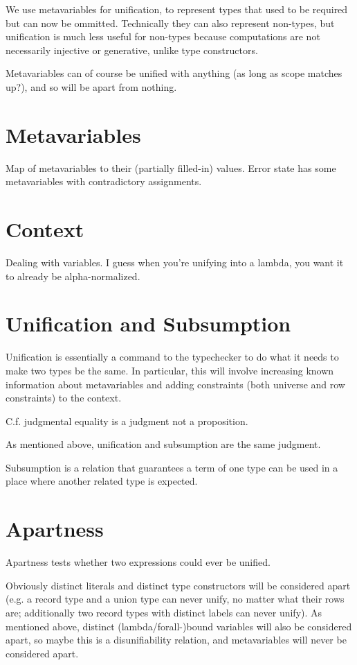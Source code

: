 \documentclass[11pt, twoside, reqno]{book}
\begin{document}
We use metavariables for unification, to represent types that used to be required but can now be ommitted.
Technically they can also represent non-types, but unification is much less useful for non-types because computations are not necessarily injective or generative, unlike type constructors.

Metavariables can of course be unified with anything (as long as scope matches up?), and so will be apart from nothing.

\section{Metavariables}

Map of metavariables to their (partially filled-in) values.
Error state has some metavariables with contradictory assignments.

\section{Context}

Dealing with variables.
I guess when you're unifying into a lambda, you want it to already be alpha-normalized.

\section{Unification and Subsumption}
Unification is essentially a command to the typechecker to do what it needs to make two types be the same.
In particular, this will involve increasing known information about metavariables and adding constraints (both universe and row constraints) to the context.

C.f. judgmental equality is a judgment not a proposition.

As mentioned above, unification and subsumption are the same judgment.

Subsumption is a relation that guarantees a term of one type can be used in a place where another related type is expected.

\section{Apartness}
Apartness tests whether two expressions could ever be unified.

Obviously distinct literals and distinct type constructors will be considered apart (e.g. a record type and a union type can never unify, no matter what their rows are; additionally two record types with distinct labels can never unify).
As mentioned above, distinct (lambda/forall-)bound variables will also be considered apart, so maybe this is a disunifiability relation, and metavariables will never be considered apart.
\end{document}
